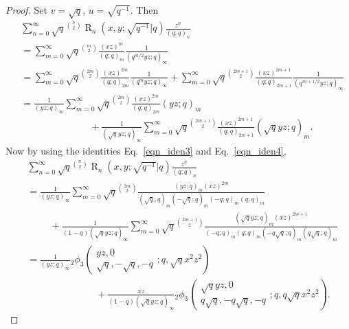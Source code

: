\documentclass{cimart}
\DeclareMathOperator{\opR}{R}
\begin{document}
\begin{proof}
Set $v=\sqrt{q}$, $u=\sqrt{q^{-1}}$. Then
    \begin{align*}
        &\sum_{n=0}^{\infty}\sqrt{q}^{\binom{n}{2}}\opR_{n}(x,y;\sqrt{q^{-1}}|q)\frac{z^n}{(q;q)_{n}}\\
        &=\sum_{m=0}^{\infty}\sqrt{q}^{\binom{m}{2}}\frac{(xz)^m}{(q;q)_{m}}\frac{1}{(q^{m/2}yz;q)_{\infty}}\\
        &=\sum_{m=0}^{\infty}\sqrt{q}^{\binom{2m}{2}}\frac{(xz)^{2m}}{(q;q)_{2m}}\frac{1}{(q^{m}yz;q)_{\infty}}+\sum_{m=0}^{\infty}\sqrt{q}^{\binom{2m+1}{2}}\frac{(xz)^{2m+1}}{(q;q)_{2m+1}}\frac{1}{(q^{m+1/2}yz;q)_{\infty}}\\
        &=\frac{1}{(yz;q)_{\infty}}\sum_{m=0}^{\infty}\sqrt{q}^{\binom{2m}{2}}\frac{(xz)^{2m}}{(q;q)_{2m}}(yz;q)_{m}\\
        &\hspace{3cm}+\frac{1}{(\sqrt{q}yz;q)_{\infty}}\sum_{m=0}^{\infty}\sqrt{q}^{\binom{2m+1}{2}}\frac{(xz)^{2m+1}}{(q;q)_{2m+1}}(\sqrt{q}yz;q)_{m}.
    \end{align*}
Now by using the identities Eq.~\eqref{eqn_iden3} and Eq.~\eqref{eqn_iden4},
\begin{align*}
    &\sum_{n=0}^{\infty}\sqrt{q}^{\binom{n}{2}}\opR_{n}(x,y;\sqrt{q^{-1}}|q)\frac{z^n}{(q;q)_{n}}\\
    &=\frac{1}{(yz;q)_{\infty}}\sum_{m=0}^{\infty}\sqrt{q}^{\binom{2m}{2}}\frac{(yz;q)_{m}(xz)^{2m}}{(\sqrt{q};q)_{m}(-\sqrt{q};q)_{m}(-q;q)_{m}(q;q)_{m}}\\
        &\hspace{1cm}+\frac{1}{(1-q)(\sqrt{q}yz;q)_{\infty}}\sum_{m=0}^{\infty}\sqrt{q}^{\binom{2m+1}{2}}\frac{(\sqrt{q}yz;q)_{m}(xz)^{2m+1}}{(-q;q)_{m}(q;q)_{m}(-q\sqrt{q};q)_{m}(q\sqrt{q};q)_{m}}\\
        &=\frac{1}{(yz;q)_{\infty}}{}_{2}\phi_{3}\left(
        \begin{array}{c}
            yz,0\\
             \sqrt{q},-\sqrt{q},-q
        \end{array};
        q,\sqrt{q}x^2z^2
        \right)\\
        &\hspace{3cm}+\frac{xz}{(1-q)(\sqrt{q}yz;q)_{\infty}}{}_{2}\phi_{3}\left(
        \begin{array}{c}
            \sqrt{q}yz,0\\
             q\sqrt{q},-q\sqrt{q},-q
        \end{array};
        q,q\sqrt{q}x^2z^2
        \right).
\end{align*}
\end{proof}
\end{document}
